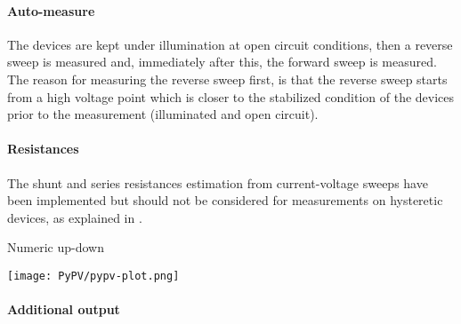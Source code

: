 		\paragraph{Auto-measure}\label{automeasure}
		The devices are kept under illumination at open circuit conditions, then a reverse sweep is measured and, immediately after this, the forward sweep is measured.
		The reason for measuring the reverse sweep first, is that the reverse sweep starts from a high voltage point which is closer to the stabilized condition of the devices prior to the measurement (illuminated and open circuit).


		\paragraph{Resistances} The shunt and series resistances estimation from current-voltage sweeps have been implemented but should not be considered for measurements on hysteretic devices, as explained in .


Numeric up-down

\begin{SCfigure}
	\centering
	\texttt{[image: PyPV/pypv-plot.png]}
	\label{fig:pypv-plot}
\end{SCfigure}

\paragraph{Additional output}

\begin{figure}
\end{figure}

